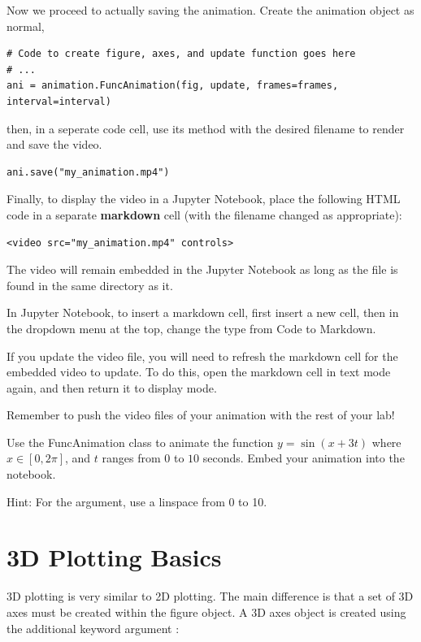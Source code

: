 Now we proceed to actually saving the animation.
Create the animation object as normal,
\begin{lstlisting}
# Code to create figure, axes, and update function goes here
# ...
ani = animation.FuncAnimation(fig, update, frames=frames, interval=interval)
\end{lstlisting}
then, in a seperate code cell, use its  method with the desired filename to render and save the video.
\begin{lstlisting}
ani.save("my_animation.mp4")
\end{lstlisting}
Finally, to display the  video in a Jupyter Notebook, place the following HTML code in a separate \textbf{markdown} cell (with the filename changed as appropriate):
\begin{lstlisting}
<video src="my_animation.mp4" controls>
\end{lstlisting}
The video will remain embedded in the Jupyter Notebook as long as the  file is found in the same directory as it.

\begin{info}
In Jupyter Notebook, to insert a markdown cell, first insert a new cell, then in the dropdown menu at the top, change the type from Code to Markdown.

If you update the video file, you will need to refresh the markdown cell for the embedded video to update.
To do this, open the markdown cell in text mode again, and then return it to display mode.

Remember to push the video files of your animation with the rest of your lab!
\end{info}

\begin{problem}
Use the FuncAnimation class to animate the function $y=\sin(x+3t)$ where $x \in [0,2\pi]$, and $t$ ranges from $0$ to $10$ seconds.
Embed your animation into the notebook.

Hint: For the  argument, use a linspace from 0 to 10.
\end{problem}


\section*{3D Plotting Basics}
3D plotting is very similar to 2D plotting.
The main difference is that a set of 3D axes must be created within the figure object.
A 3D axes object is created using the additional keyword argument :

